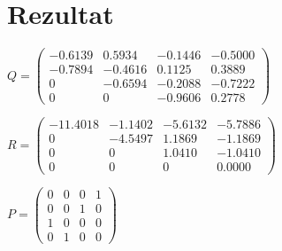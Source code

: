 \documentclass{article}
\begin{document}
\section*{Rezultat}
\begin{center}
$
Q =\begin{pmatrix}

    -0.6139  &  0.5934 & -0.1446  &       -0.5000\\
    -0.7894  &  -0.4616  & 0.1125 &        0.3889\\
          0  &  -0.6594  &  -0.2088  &  -0.7222\\
          0  &       0  &   -0.9606  &   0.2778
\end{pmatrix}
$
\end{center}

\begin{center}
$
R =\begin{pmatrix}
  -11.4018  &    -1.1402  &  -5.6132  &  -5.7886\\
    0  &  -4.5497& 1.1869 &  -1.1869\\
    0  & 0  &  1.0410  & -1.0410\\
    0  & 0  &  0  &  0.0000
\end{pmatrix}
$
\end{center} 

\begin{center}
$
P =\begin{pmatrix}
  0  &   0  &   0   & 1\\
  0  &   0  &   1   &  0\\
  1  &   0  &   0   &  0\\
  0  &   1  &   0   &  0
\end{pmatrix}
$
\end{center}
\end{document}
